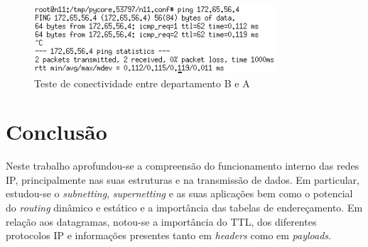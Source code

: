 \documentclass{llncs}
\begin{document}
\begin{figure}[H]
\begin{center}
\includegraphics[width=9cm]{depBtoDepA.PNG}
\end{center}
\caption{Teste de conectividade entre departamento B e A}
\end{figure}

\section{Conclusão}
\hspace{3mm}
Neste trabalho aprofundou-se a compreensão do funcionamento interno das redes IP, principalmente nas suas estruturas e na transmissão de dados. Em particular, estudou-se o \textit{subnetting}, \textit{supernetting} e as suas aplicações bem como o potencial do \textit{routing} dinâmico e estático e a importância das tabelas de endereçamento. Em relação aos datagramas, notou-se a importância do TTL, dos diferentes protocolos IP e informações presentes tanto em \textit{headers} como em \textit{payloads}.
\end{document}
